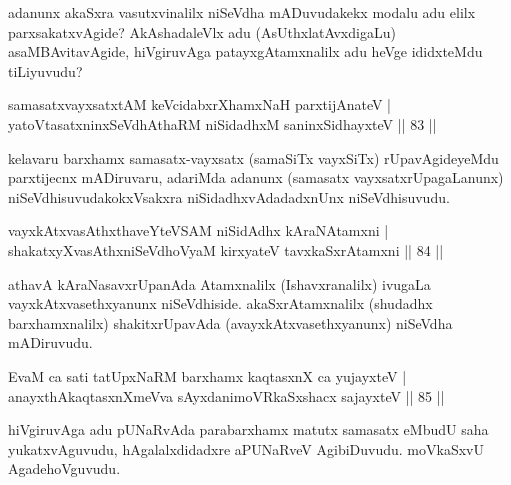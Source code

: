 \begin{artha}
adanunx akaSxra vasutxvinalilx niSeVdha mADuvudakekx modalu adu elilx parxsakatxvAgide? AkAshadaleVlx adu (AsUthxlatAvxdigaLu) asaMBAvitavAgide, hiVgiruvAga patayxgAtamxnalilx adu heVge ididxteMdu tiLiyuvudu?
\end{artha}


\begin{shl}
samasatxvayxsatxtAM keVcidabxrXhamxNaH parxtijAnateV |\\
yatoV\s tasatxninxSeVdhAthaRM niSidadhxM saninxSidhayxteV \hfill || 83 ||
\end{shl}

\begin{artha}
kelavaru barxhamx samasatx-vayxsatx (samaSiTx vayxSiTx) rUpavAgideyeMdu parxtijecnx mADiruvaru, adariMda adanunx (samasatx vayxsatxrUpagaLanunx) niSeVdhisuvudakokxVsakxra niSidadhxvAdadadxnUnx niSeVdhisuvudu.
\end{artha}

\begin{shl}
vayxkAtxvasAthx\s thaveYteVSAM niSidAdhx kAraNAtamxni |\\
shakatxyXvasAthxniSeVdhoV\s yaM kirxyateV tavxkaSxrAtamxni \hfill || 84 ||
\end{shl}

\begin{artha}
athavA kAraNasavxrUpanAda Atamxnalilx (Ishavxranalilx) ivugaLa vayxkAtxvasethxyanunx niSeVdhiside. akaSxrAtamxnalilx (shudadhx barxhamxnalilx) shakitxrUpavAda (avayxkAtxvasethxyanunx) niSeVdha mADiruvudu.
\end{artha}


\begin{shl}
EvaM ca sati tatUpxNaRM barxhamx kaqtasxnX ca yujayxteV |\\
anayxthA\s kaqtasxnXmeVva sAyxdanimoVRkaSxshacx sajayxteV \hfill || 85 ||
\end{shl}

\begin{artha}
hiVgiruvAga adu pUNaRvAda parabarxhamx matutx samasatx eMbudU saha yukatxvAguvudu, hAgalalxdidadxre aPUNaRveV AgibiDuvudu. moVkaSxvU Agade\break hoVguvudu. 
\end{artha}


